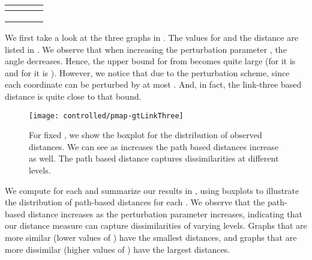 \begin{table}[bht]
{
\begin{tabular}{|r|l|c|r|}
\hline
\multicolumn{1}{|c|}{} & \multicolumn{1}{c|}{} & 
\multicolumn{1}{c|}{} &
\multicolumn{1}{c|}{}
\\\hline\hline
 &  &  &  \\\hline
 &  &  &  \\\hline
 &  &  &  \\
\hline
\end{tabular}
}
\end{table}
We first take a look at the three graphs in .
The values for  and the distance 
 are listed in . 
We observe that when increasing the perturbation  parameter , the angle 
 decreases.  Hence, the upper bound for
 from  becomes
quite large (for  it is  and for  it is ).
However, we notice that due to the perturbation scheme,
 since each coordinate can be
perturbed by at most . And, in fact, the link-three based distance is quite
close to that bound.


\begin{figure}[ht]
\centering
\texttt{[image: controlled/pmap-gtLinkThree]}
\caption{For fixed , we show the boxplot for the
distribution of observed distances. We can see as  increases the path based
distances increase as well. The path based distance captures dissimilarities at
different levels.
\label{fig-controlled_result}}
\end{figure}
We compute  for each  and  summarize
our results in , using boxplots to illustrate the
distribution of path-based distances for each . We observe that
the path-based 
distance   increases as the perturbation parameter  increases, indicating 
that our distance measure can capture dissimilarities of varying
levels. Graphs that are more similar (lower values of ) have the smallest distances, and graphs that are more dissimilar (higher values of ) have the largest distances. 










